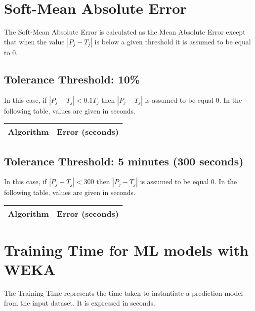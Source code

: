 \documentclass[10pt,a4paper]{article}
\begin{document}
\section{Soft-Mean Absolute Error}

The Soft-Mean Absolute Error is calculated as the Mean Absolute Error except that when the value $|P_j-T_j |$ is below a given threshold it is assumed to be equal to 0.

\subsection{Tolerance Threshold: 10\%}

In this case, if $|P_j-T_j |<0.1 T_j$ then $|P_j-T_j |$ is assumed to be equal 0. In the following table, values are given in seconds.

\begin{center}
\begin{tabular}{cc}
\toprule
\textbf{Algorithm} & \textbf{Error (seconds)} \\
\midrule

\bottomrule
\end{tabular}
\end{center}



\subsection{Tolerance Threshold: 5 minutes (300 seconds)}

In this case, if  $|P_j-T_j |<300$ then $|P_j-T_j |$ is assumed to be equal 0. In the following table, values are given in seconds.

\begin{center}
\begin{tabular}{cc}
\toprule
\textbf{Algorithm} & \textbf{Error (seconds)} \\
\midrule

\bottomrule
\end{tabular}
\end{center}



\section{Training Time for ML models with WEKA}

The Training Time represents the time taken to instantiate a prediction model from the input dataset. It is expressed in seconds.
\end{document}
